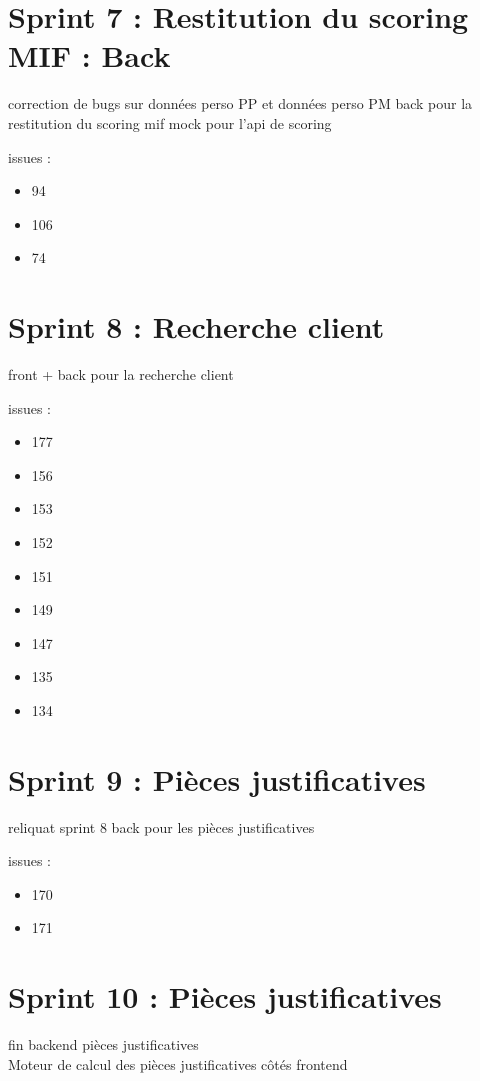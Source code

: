 \section{Sprint 7 : Restitution du scoring MIF : Back}
	

	correction de bugs sur données perso PP et données perso PM	
	back pour la restitution du scoring mif
	mock pour l'api de scoring
	
issues :
\begin{itemize}
	\item 94
	\item 106
	\item 74
\end{itemize}

\section{Sprint 8 : Recherche client}
	

front + back pour la recherche client

issues :
\begin{itemize}
	\item 177
	\item 156
	\item 153
	\item 152
	\item 151
	\item 149
	\item 147
	\item 135
	\item 134
\end{itemize}

\section{Sprint 9 : Pièces justificatives}
	

reliquat sprint 8
back pour les pièces justificatives

issues :
\begin{itemize}
	\item 170
	\item 171
\end{itemize}

\section{Sprint 10 : Pièces justificatives}
	
	
fin backend pièces justificatives \\
Moteur de calcul des pièces justificatives côtés frontend